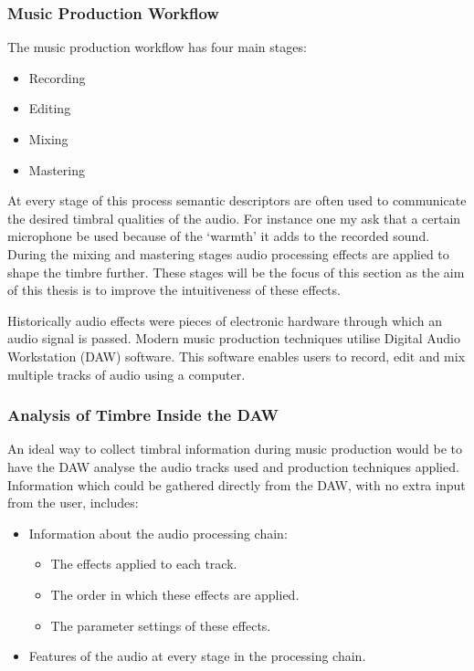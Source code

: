 		\subsubsection{Music Production Workflow}

			The music production workflow has four main stages:

			\begin{itemize}
				\item Recording
				\item Editing
				\item Mixing
				\item Mastering
			\end{itemize}

			At every stage of this process semantic descriptors are often used to communicate the desired
			timbral qualities of the audio. For instance one my ask that a certain microphone be used because of
			the `warmth' it adds to the recorded sound. During the mixing and mastering stages audio processing
			effects are applied to shape the timbre further.  These stages will be the focus of this section as
			the aim of this thesis is to improve the intuitiveness of these effects.

			Historically audio effects were pieces of electronic hardware through which an audio signal is
			passed. Modern music production techniques utilise Digital Audio Workstation (DAW) software. This
			software enables users to record, edit and mix multiple tracks of audio using a computer. 
			
		\subsubsection{Analysis of Timbre Inside the DAW}
			An ideal way to collect timbral information during music production would be to have the DAW analyse
			the audio tracks used and production techniques applied. Information which could be gathered
			directly from the DAW, with no extra input from the user, includes:

			\begin{itemize}
				\item Information about the audio processing chain:
				\begin{itemize}
					\item The effects applied to each track.
					\item The order in which these effects are applied.
					\item The parameter settings of these effects.
				\end{itemize}

				\item Features of the audio at every stage in the processing chain.
			\end{itemize}

